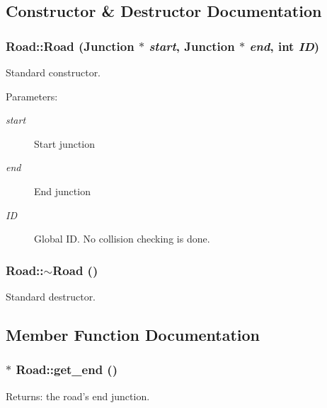 \subsection{Constructor \& Destructor Documentation}
\subsubsection{\setlength{\rightskip}{0pt plus 5cm}Road::Road ({\bf Junction} $\ast$ {\em start}, {\bf Junction} $\ast$ {\em end}, int {\em ID})}\label{classRoad_Roada0}


Standard constructor. 

\begin{Desc}
\item[Parameters:]
\begin{description}
\item[{\em start}]Start junction \item[{\em end}]End junction \item[{\em ID}]Global ID. No collision checking is done.\end{description}
\end{Desc}
\subsubsection{\setlength{\rightskip}{0pt plus 5cm}Road::$\sim${\bf Road} ()}\label{classRoad_Roada1}


Standard destructor. 



\subsection{Member Function Documentation}
\subsubsection{$\ast$ Road::get\_\-end ()\hspace{0.3cm}{\tt  [inline]}}\label{classRoad_Roada4}


\begin{Desc}
\item[Returns:]the road's end junction.\end{Desc}
